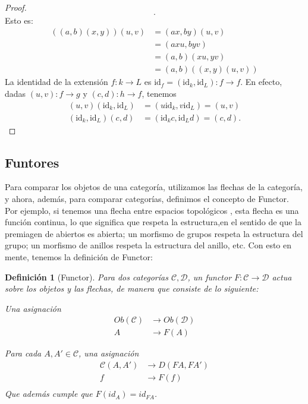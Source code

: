 \documentclass[12pt,letterpaper,titlepage]{article}
\newtheorem*{defn}{Definición}
\theoremstyle{definition}
\newcommand\<{\langle}
\renewcommand\>{\rangle}
\newcommand{\id}{\mathrm{id}}
\begin{document}
\begin{proof}
\[  .\]
  Esto es:
  \begin{align*}
      ((a,b)(x,y))(u,v)
      &= (ax,by)(u,v) \\
      &= (axu,byv) \\
      &= (a,b)(xu,yv) \\
      &= (a,b)((x,y)(u,v))
  \end{align*}
  La identidad de la extensión $f:k\to L$ es
  $\id_f = (\id_k,\id_L):f\to f$.
  En efecto, dadas $(u,v):f\to g$ y $(c,d):h\to f$, tenemos
  \begin{align*}
      (u,v)(\id_k,\id_L) &= (u \id_k,v \id_L) = (u,v) \\
      (\id_k,\id_L)(c,d) &= (\id_k c,\id_L d) = (c,d).
  \end{align*}
\end{proof}


\subsection{Funtores}
    Para comparar los objetos de una categoría, utilizamos las flechas de la categoría, y ahora, además, para comparar categorías, definimos el concepto de Functor.
    Por ejemplo, si tenemos una flecha entre espacios topológicos , esta flecha es una función continua, lo que significa que respeta la estructura,en el sentido de que la premiagen de abiertos es abierta; un morfismo de grupos respeta la estructura del grupo; un morfismo de anillos respeta la estructura del anillo, etc.
    Con esto en mente, tenemos la definición de Functor:
    \begin{defn}[Functor]
        Para dos categorías $\mathcal{C,D}$, un functor $F:\mathcal{C\to D}$ actua sobre los objetos y las flechas, de manera que consiste de lo siguiente:
        \item Una asignación 
            \begin{align*}
                Ob(\mathcal{C}) & \longrightarrow Ob(\mathcal{D}) \\
                A & \to F(A)
            \end{align*}
        \item Para cada $A,A'\in \mathcal{C}$, una asignación
            \begin{align*}
                \mathcal{C}(A,A') & \longrightarrow D(FA,FA') \\
                f & \to F(f) \\
            \end{align*}
        Que además cumple que $F(id_A)=id_{FA}$. 
    \end{defn}
    
\end{document}
